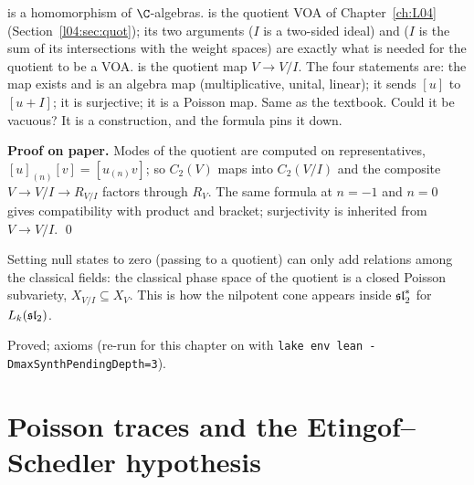 \begin{dictionary}
 is a homomorphism of $\C$-algebras.  is the quotient VOA of
Chapter~\ref{ch:L04} (Section~\ref{l04:sec:quot}); its two arguments  ($I$ is a two-sided ideal) and
 ($I$ is the sum of its intersections with the weight spaces) are exactly what is needed for the
quotient to be a VOA.  is the quotient map $V\to V/I$. The four statements are: the map exists
and is an algebra map (multiplicative, unital, linear); it sends $[u]$ to $[u+I]$; it is surjective; it is a
Poisson map. Same as the textbook. Could it be vacuous? It is a construction, and the formula
 pins it down.
\end{dictionary}

\textbf{Proof on paper.} Modes of the quotient are computed on representatives, $[u]_{(n)}[v] = [u_{(n)}v]$; so
$C_2(V)$ maps into $C_2(V/I)$ and the composite $V\to V/I\to R_{V/I}$ factors through $R_V$. The same formula at
$n=-1$ and $n=0$ gives compatibility with product and bracket; surjectivity is inherited from $V\to V/I$. \qed

\begin{physics}
Setting null states to zero (passing to a quotient) can only add relations among the classical fields: the
classical phase space of the quotient is a closed Poisson subvariety, $X_{V/I}\subseteq X_V$. This is how the
nilpotent cone appears inside $\mathfrak{sl}_2^*$ for $L_k(\mathfrak{sl}_2)$.
\end{physics}

\begin{status}
Proved; axioms \lean{[propext, Classical.}\allowbreak{}\allowbreak\lean{sound]} (re-run for this chapter on 
with \texttt{lake env lean -DmaxSynthPendingDepth=3}).
\end{status}

\section{Poisson traces and the Etingof--Schedler hypothesis}\label{l16:sec:traces}

